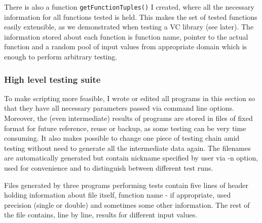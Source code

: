 \documentclass[oneside,10pt,a4paper]{article}
\newcommand{\Cpp}{C\raisebox{0.15ex}[0ex][0ex]{++}}
\begin{document}
There is also a function {\tt getFunctionTuples()} I created, where all the necessary information for all functions tested is held. This makes the set of tested functions easily extensible, as we demonstrated when testing a VC library (see later). The information stored about each function is function name, pointer to the actual function and a random pool of input values from appropriate domain which is enough to perform arbitrary testing.


\subsubsection{High level testing suite}
To make scripting more feasible, I wrote or edited all programs in this section so that they have all necessary parameters passed via command line options. Moreover, the (even intermediate) results of programs are stored in files of fixed format for future reference, reuse or backup, as some testing can be very time consuming. It also makes possible to change one piece of testing chain amid testing without need to generate all the intermediate data again. The filenames are automatically generated but contain nickname specified by user via -n option, used for convenience and to distinguish between different test runs.

Files generated by three programs performing tests contain five lines of header holding information about file itself, function name - if appropriate, used precision (single or double) and sometimes some other information. The rest of the file contains, line by line, results for different input values.
\end{document}
